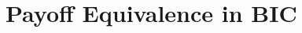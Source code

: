 \documentclass[english,10pt
,aspectratio=169
,handout
]{beamer}
\begin{document}

\section{Payoff Equivalence in BIC}

\end{document}
